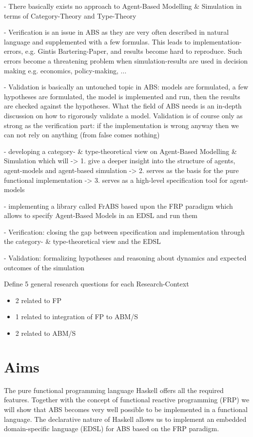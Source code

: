 - There basically exists no approach to Agent-Based Modelling \& Simulation in terms of Category-Theory and Type-Theory

- Verification is an issue in ABS as they are very often described in natural language and supplemented with a few formulas. This leads to implementation-errors, e.g. Gintis Bartering-Paper, and results become hard to reproduce. Such errors become a threatening problem when simulation-results are used in decision making e.g. economics, policy-making, ...

- Validation is basically an untouched topic in ABS: models are formulated, a few hypotheses are formulated, the model is implemented and run, then the results are checked against the hypotheses. What the field of ABS needs is an in-depth discussion on how to rigorously validate a model. Validation is of course only as strong as the verification part: if the implementation is wrong anyway then we can not rely on anything (from false comes nothing)


- developing a category- \& type-theoretical view on Agent-Based Modelling \& Simulation which will 
	-> 1. give a deeper insight into the structure of agents, agent-models and agent-based simulation
	-> 2. serves as the basis for the pure functional implementation
	-> 3. serves as a high-level specification tool for agent-models

- implementing a library called FrABS based upon the FRP paradigm which allows to specify Agent-Based Models in an EDSL and run them

- Verification: closing the gap between specification and implementation through the category- \& type-theoretical view and the EDSL

- Validation: formalizing hypotheses and reasoning about dynamics and expected outcomes of the simulation

Define 5 general research questions for each Research-Context
	\begin{itemize}
    \item 2 related to FP
    \item 1 related to integration of FP to ABM/S
    \item 2 related to ABM/S
    \end{itemize}


\section{Aims}
The pure functional programming language Haskell offers all the required features. Together with the concept of functional reactive programming (FRP) we will show that ABS becomes very well possible to be implemented in a functional language. The declarative nature of Haskell allows us to implement an embedded domain-specific language (EDSL) for ABS based on the FRP paradigm.


